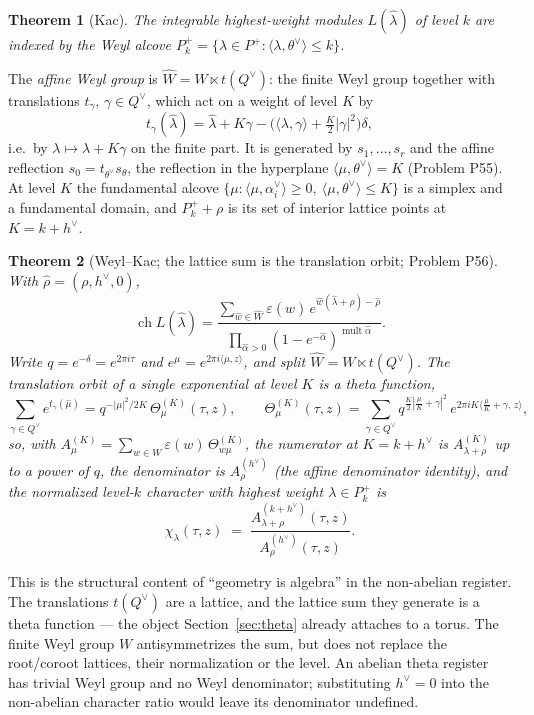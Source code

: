 \documentclass[11pt]{article}
\newtheorem{theorem}{Theorem}[section]
\theoremstyle{definition}
\theoremstyle{remark}
\begin{document}
\begin{theorem}[Kac]\label{thm:integrable}
The integrable highest-weight modules $L(\hat\lambda)$ of level $k$ are
indexed by the \emph{Weyl alcove}
$P_k^+ = \{\lambda\in P^+ : \langle\lambda,\theta^\vee\rangle\le k\}$.
\end{theorem}

The \emph{affine Weyl group} is $\hat W = W\ltimes t(Q^\vee)$: the finite
Weyl group together with translations $t_\gamma$, $\gamma\in Q^\vee$, which
act on a weight of level $K$ by
\[
  t_\gamma(\hat\lambda) = \hat\lambda + K\gamma - \big(\langle\lambda,\gamma\rangle+\tfrac K2|\gamma|^2\big)\delta,
\]
i.e.\ by $\lambda\mapsto\lambda+K\gamma$ on the finite part. It is
generated by $s_1,\dots,s_r$ and the affine reflection
$s_0 = t_{\theta^\vee}s_\theta$, the reflection in the hyperplane
$\langle\mu,\theta^\vee\rangle = K$ (Problem P55). At level $K$ the
fundamental alcove
$\{\mu : \langle\mu,\alpha_i^\vee\rangle\ge0,\ \langle\mu,\theta^\vee\rangle\le K\}$
is a simplex and a fundamental domain, and $P_k^+ + \rho$ is its set of
interior lattice points at $K = k+h^\vee$.

\begin{theorem}[Weyl--Kac; the lattice sum is the translation orbit; Problem P56]\label{thm:weylkac}
With $\hat\rho = (\rho,h^\vee,0)$,
\[
  \operatorname{ch}L(\hat\lambda) = \frac{\sum_{\hat w\in\hat W}\varepsilon(\hat w)\,e^{\hat w(\hat\lambda+\hat\rho)-\hat\rho}}
  {\prod_{\hat\alpha>0}(1-e^{-\hat\alpha})^{\operatorname{mult}\hat\alpha}} .
\]
Write $q = e^{-\delta} = e^{2\pi i\tau}$ and $e^{\mu} = e^{2\pi i\langle\mu,z\rangle}$,
and split $\hat W = W\ltimes t(Q^\vee)$. The translation orbit of a single
exponential at level $K$ is a theta function,
\[
  \sum_{\gamma\in Q^\vee}e^{t_\gamma(\hat\mu)} = q^{-|\mu|^2/2K}\,\Theta^{(K)}_\mu(\tau,z),\qquad
  \Theta^{(K)}_\mu(\tau,z) = \sum_{\gamma\in Q^\vee}q^{\frac K2|\frac\mu K+\gamma|^2}\,e^{2\pi iK\langle\frac\mu K+\gamma,\,z\rangle},
\]
so, with $A^{(K)}_\mu = \sum_{w\in W}\varepsilon(w)\,\Theta^{(K)}_{w\mu}$,
the numerator at $K = k+h^\vee$ is $A^{(K)}_{\lambda+\rho}$ up to a power of
$q$, the denominator is $A^{(h^\vee)}_{\rho}$ (the affine denominator
identity), and the normalized level-$k$ character with highest weight
$\lambda\in P_k^+$ is
\[
  \chi_\lambda(\tau,z) \;=\; \frac{A^{(k+h^\vee)}_{\lambda+\rho}(\tau,z)}
                                  {A^{(h^\vee)}_{\rho}(\tau,z)} .
\]
\end{theorem}

This is the structural content of ``geometry is algebra'' in the
non-abelian register. The translations $t(Q^\vee)$ are a lattice, and the
lattice sum they generate is a theta function --- the object
Section~\ref{sec:theta} already attaches to a torus. The finite Weyl
group $W$ antisymmetrizes the sum, but does not replace the root/coroot
lattices, their normalization or the level. An abelian theta register has
trivial Weyl group and no Weyl denominator; substituting $h^\vee=0$ into
the non-abelian character ratio would leave its denominator undefined.
\end{document}
